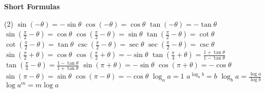 \documentclass[10pt,a4paper,landscape]{article}
\begin{document}
\begin{multicols*}{3}
		\noindent \textbf{Short Formulas}
		\vspace{-.15 cm}
		\begin{tasks}(2)
			\task $\sin(-\theta) = -\sin\theta$
			\task $\cos(-\theta) = \cos\theta$
			\task $\tan(-\theta) = -\tan\theta$
			\task $\sin\left(\frac{\pi}{2} - \theta\right) = \cos\theta$
			\task $\cos\left(\frac{\pi}{2} - \theta\right) = \sin\theta$
			\task $\tan\left(\frac{\pi}{2} - \theta\right) = \cot\theta$
			\task $\cot\left(\frac{\pi}{2} - \theta\right) = \tan\theta$
			\task $\csc\left(\frac{\pi}{2} - \theta\right) = \sec\theta$
			\task $\sec\left(\frac{\pi}{2} - \theta\right) = \csc\theta$
			\task $\sin\left(\frac{\pi}{2} + \theta\right) = \cos\theta$
			\task $\cos\left(\frac{\pi}{2} + \theta\right) = -\sin\theta$
			\task $\tan\left(\frac{\pi}{4} + \theta\right) = \frac{1+\tan\theta}{1-\tan\theta}$
			\task $\tan\left(\frac{\pi}{4} - \theta\right) = \frac{1-\tan\theta}{1+\tan\theta}$
			\task $\sin(\pi + \theta) = -\sin\theta$
			\task $\cos(\pi + \theta) = -\cos\theta$
			\task $\sin(\pi - \theta) = \sin\theta$
			\task $\cos(\pi - \theta) = -\cos\theta$
			\task $\log_a a = 1$
			\task $a^{\log_a b} = b$
			\task $\log_b a = \frac{\log a}{\log b}$
			\task $\log a^m = m \log a$
		\end{tasks}
		
		
	\end{multicols*}
	
\end{document}
